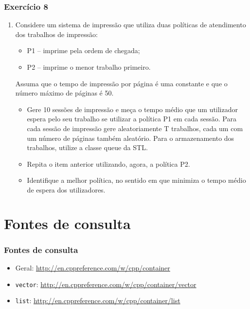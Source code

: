 \documentclass[xcolor={dvipsnames,table},aspectratio=169]{beamer}
\newcommand\setItemnumber[1]{\setcounter{enumi}{\numexpr#1-1\relax}}
\begin{document}
\begin{frame}[fragile]\frametitle{Exercício 8}
\begin{enumerate}
	\setItemnumber{8}
	\item Considere um sistema de impressão que utiliza duas políticas de atendimento dos trabalhos de impressão:\\
	\begin{itemize}
		\item P1 -- imprime pela ordem de chegada;
		\item P2 -- imprime o menor trabalho primeiro.
	\end{itemize}
Assuma que o tempo de impressão por página é uma constante e que o número máximo de páginas é 50.\\
	\begin{itemize}
		\item Gere 10 sessões de impressão e meça o tempo médio que um utilizador espera pelo seu trabalho se utilizar a política P1 em cada sessão. Para cada sessão de impressão gere aleatoriamente T trabalhos, cada um com um número de páginas também aleatório. Para o armazenamento dos trabalhos, utilize a classe queue da STL.
		\item Repita o item anterior utilizando, agora, a política P2.
		\item Identifique a melhor política, no sentido em que minimiza o tempo médio de espera dos utilizadores.
	\end{itemize}
\end{enumerate}
\end{frame}

\section{Fontes de consulta}

\begin{frame}\frametitle{Fontes de consulta}
\begin{itemize}
	\item Geral: \url{http://en.cppreference.com/w/cpp/container}
	\item \texttt{vector}: \url{http://en.cppreference.com/w/cpp/container/vector}
	\item \texttt{list}: \url{http://en.cppreference.com/w/cpp/container/list}
\end{itemize}
\end{frame}
\end{document}
